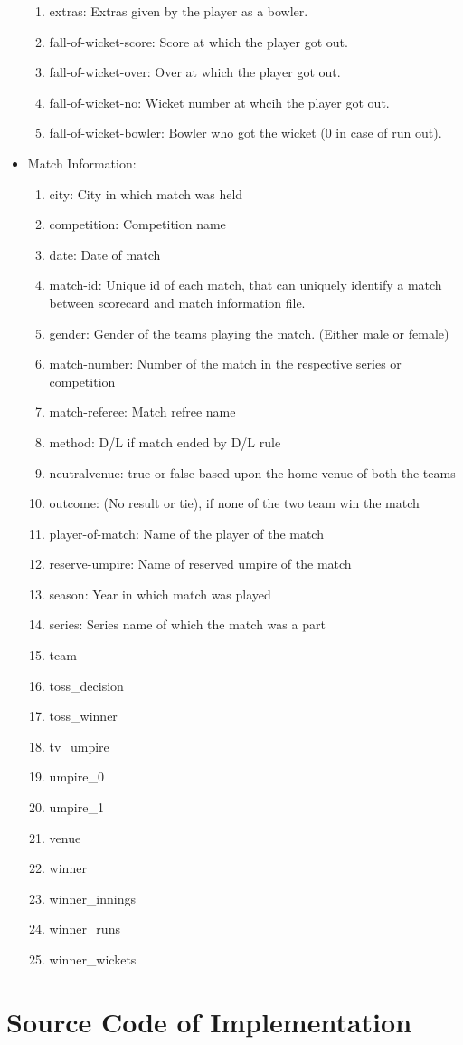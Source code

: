 \documentclass[fleqn,10pt]{wlscirep}
\begin{document}
\begin{itemize}
\begin{enumerate}
\item extras: Extras given by the player as a bowler.
\item fall-of-wicket-score: Score at which the player got out.
\item fall-of-wicket-over: Over at which the player got out.
\item fall-of-wicket-no: Wicket number at whcih the player got out.
\item fall-of-wicket-bowler: Bowler who got the wicket (0 in case of run out).
\end{enumerate}
\item Match Information:
\begin{enumerate}
    \item city: City in which match was held
    \item competition: Competition name
    \item date: Date of match
    \item match-id: Unique id of each match, that can uniquely identify a match between scorecard and match information file.
    \item gender: Gender of the teams playing the match. (Either male or female)
    \item match-number: Number of the match in the respective series or competition
    \item match-referee: Match refree name
    \item method: D/L if match ended by D/L rule
    \item neutralvenue: true or false based upon the home venue of both the teams
    \item outcome: (No result or tie), if none of the two team win the match
    \item player-of-match: Name of the player of the match
    \item reserve-umpire: Name of reserved umpire of the match
    \item season: Year in which match was played
    \item series: Series name of which the match was a part
    \item team 
    \item toss_decision
    \item toss_winner
    \item tv_umpire
    \item umpire_0
    \item umpire_1
    \item venue
    \item winner
    \item winner_innings
    \item winner_runs
    \item winner_wickets
\end{enumerate}
\end{itemize}
\section{Source Code of Implementation}
\end{document}

